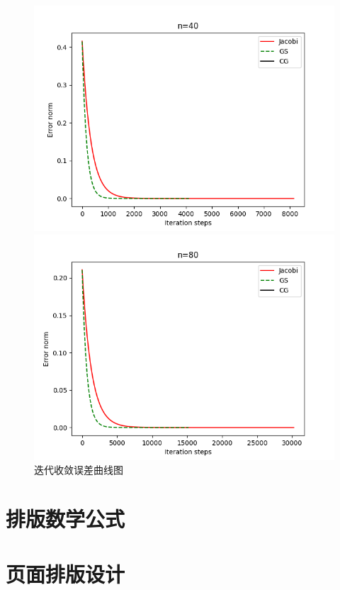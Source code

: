 \documentclass{ctexart}
\begin{document}
\begin{figure}
    \begin{minipage}{8.5cm}
         \includegraphics[scale= 0.5]{Figure_40}
    \end{minipage}
    \begin{minipage}{8.5cm}
         \includegraphics[scale= 0.5]{Figure_80}
    \end{minipage}
    \caption{迭代收敛误差曲线图}
\end{figure}  



\section{排版数学公式}

\section{页面排版设计}
\end{document}
